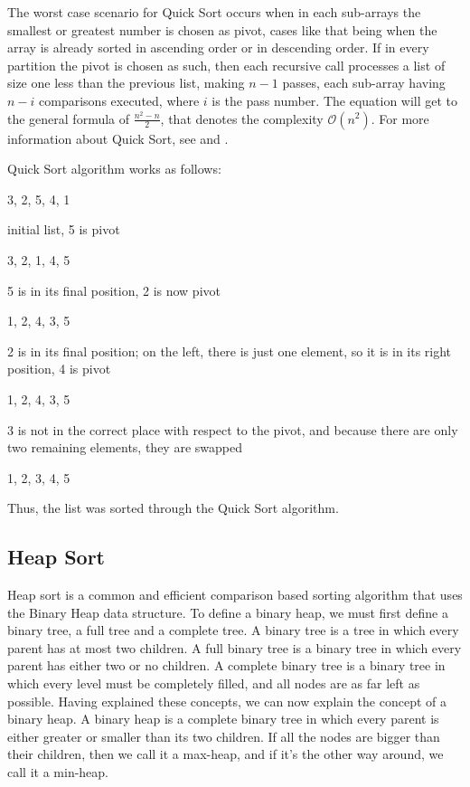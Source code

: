 \documentclass[]{article}
\begin{document}
The worst case scenario for Quick Sort occurs when in each sub-arrays the smallest or greatest number is chosen as pivot, cases like that being when the array is already sorted in ascending order or in descending order. If in every partition the pivot is chosen as such, then each recursive call processes a list of size one less than the previous list, making $n-1$ passes, each sub-array having $n-i$ comparisons executed, where $i$ is the pass number. The equation will get to the general formula of $\textstyle\frac{n^2-n}{2}$, that denotes the complexity $\mathcal{O}(n^2)$. For more information about Quick Sort, see \cite{Knuth:1998:Vol3} and \cite{Cormen:2009:IAT}.

\noindent
Quick Sort algorithm works as follows:
\begin{center}
3, 2, 5, 4, 1

initial list, 5 is pivot

3, 2, 1, 4, 5

5 is in its final position, 2 is now pivot

1, 2, 4, 3, 5

2 is in its final position; on the left, there is just one element, so it is in its right position, 4 is pivot

1, 2, 4, 3, 5

3 is not in the correct place with respect to the pivot, and because there are only two remaining elements, they are swapped

1, 2, 3, 4, 5
\end{center}

\noindent
Thus, the list was sorted through the Quick Sort algorithm.
\pagebreak

	\subsection{Heap Sort}
Heap sort is a common and efficient comparison based sorting algorithm that uses the Binary Heap data structure. To define a binary heap, we must first define a binary tree, a full tree and a complete tree. A binary tree is a tree in which every parent has at most two children. A full binary tree is a binary tree in which every parent has either two or no children. A complete binary tree is a binary tree in which every level must be completely filled, and all nodes are as far left as possible. Having explained these concepts, we can now explain the concept of a binary heap. A binary heap is a complete binary tree in which every parent is either greater or smaller than its two children. If all the nodes are bigger than their children, then we call it a max-heap, and if it's the other way around, we call it a min-heap.
\end{document}
